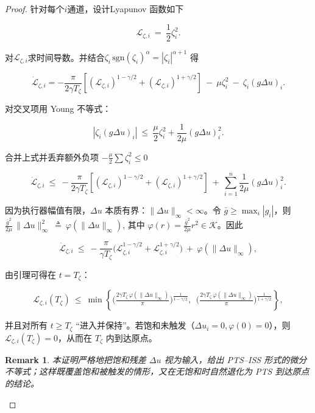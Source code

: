\documentclass[pdflatex,sn-mathphys-num]{sn-jnl}%
\theoremstyle{thmstyleone}%
\theoremstyle{thmstyletwo}%
\newtheorem{remark}{Remark}%
\theoremstyle{thmstylethree}%
\begin{document}
	\begin{proof}
	
	针对每个$i$通道，设计Lyapunov 函数如下
	
	$$
	\mathcal{L}_{\zeta,i}\ =\ \frac12\zeta_i^2.
	$$
	
	对$\mathcal{L}_{\zeta,i}$求时间导数。并结合$\zeta_i\,\mathrm{sgn}(\zeta_i)^\alpha=|\zeta_i|^{\alpha+1}$ 得
	
	$$
	\dot{\mathcal{L}}_{\zeta,i}= -\frac{\pi}{2\gamma T_\zeta}\left[(\mathcal{L}_{\zeta,i})^{1-{\gamma}/{2}}+(\mathcal{L}_{\zeta,i})^{1+{\gamma}/{2}}\right]\ -\ \mu\zeta_i^2\ -\  \zeta_i(g \Delta u)_i.
	$$
	
	
	
	对交叉项用 Young 不等式：
	
	$$
	|\zeta_i(g \Delta u)_i|\ \le\ \frac{\mu}{2}\zeta_i^2+\frac{1}{2\mu}(g \Delta u)_i^2 .
	$$
	
	合并上式并丢弃额外负项 $-\frac{\mu}{2}\sum\zeta_i^2\le0$
	
	$$
		\dot{\mathcal{L}}_{\zeta,i}
	\ \le\
	-\frac{\pi}{2\gamma T_\zeta}\left[(\mathcal{L}_{\zeta,i})^{1-{\gamma}/{2}}+(\mathcal{L}_{\zeta,i})^{1+{\gamma}/{2}}\right]
	\ +\ \sum_{i=1}^{n}\frac{1}{2\mu}(g \Delta u)_i^2 .
	$$
	

	因为执行器幅值有限，$\Delta u$ 本质有界：$\|\Delta u\|_\infty<\infty$。令 $\bar g\ge \max_i|g_i|$，则
	$\frac{\bar g^2}{2\mu}\,\|\Delta u\|_\infty^2\ \triangleq\ \varphi (\|\Delta u\|_\infty)$, 其中 $\varphi (r)=\frac{\bar g^2}{2\mu} r^2\in\mathcal K$。因此
	 
	$$
	\dot{\mathcal{L}}_{\zeta,i}
	\ \le\
	-\frac{\pi}{\gamma T_\zeta}\Big(\mathcal{L}_{\zeta,i}^{1-{\gamma}/{2}}+\mathcal{L}_{\zeta,i}^{1+{\gamma}/{2}}\Big)
	\ +\ \varphi (\|\Delta u\|_\infty),
	$$
	
	
	由引理可得在 $t=T_\zeta$：
	
	$$
	\mathcal{L}_{\zeta,i}(T_\zeta)\ \le\
	\min\!\left\{
	\Big(\tfrac{2\gamma T_\zeta\,\varphi (\|\Delta u\|_\infty)}{\pi}\Big)^{\!\frac{1}{1-{\gamma}/{2}}},
	\ \ 
	\Big(\tfrac{2\gamma T_\zeta\,\varphi (\|\Delta u\|_\infty)}{\pi}\Big)^{\!\frac{1}{1+{\gamma}/{2}}}
	\right\},
	$$
	 
	并且对所有 $t\ge T_\zeta$ “进入并保持”。若饱和未触发（$\Delta u_i=0, \varphi (0)=0$），则 $\mathcal{L}_{\zeta,i}(T_\zeta)=0$，从而在 $T_\zeta$ 内到达原点。
	
	\begin{remark}
	本证明严格地把饱和残差 $\Delta u$ 视为输入，给出 PTS–ISS 形式的微分不等式；这样既覆盖饱和被触发的情形，又在无饱和时自然退化为 PTS 到达原点的结论。
	\end{remark}
	
	\end{proof}
	
\end{document}
